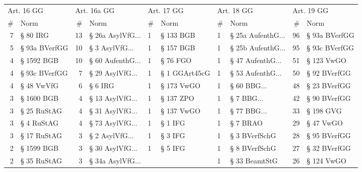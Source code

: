 \vspace{3mm}
\begin{tabular}{rlrlllllrl}
\toprule
\multicolumn{2}{l}{Art. 16 GG} & \multicolumn{2}{l}{Art. 16a GG} & \multicolumn{2}{l}{Art. 17 GG} & \multicolumn{2}{l}{Art. 18 GG} & \multicolumn{2}{l}{Art. 19 GG} \\
         \# &              Norm &           \# &                Norm &          \# &          Norm &          \# &                Norm &          \# &           Norm \\
\midrule
         7 &          § 80 IRG &          13 &  § 26a AsylVfG... &          1 &     § 133 BGB &          1 & § 25a AufenthG... &         96 &  § 93a BVerfGG \\
         5 &     § 93a BVerfGG &          10 &    § 3 AsylVfG... &          1 &     § 157 BGB &          1 & § 25b AufenthG... &         95 &  § 93c BVerfGG \\
         4 &        § 1592 BGB &          10 &  § 60 AufenthG... &          1 &      § 76 FGO &          1 &  § 47 AufenthG... &         51 &     § 123 VwGO \\
         4 &     § 93c BVerfGG &           7 &   § 29 AsylVfG... &          1 & § 1 GGArt45cG &          1 &  § 53 AufenthG... &         50 &   § 92 BVerfGG \\
         4 &        § 48 VwVfG &           6 &             § 6 IRG &          1 &    § 173 VwGO &          1 &       § 60 BBG... &         48 &   § 23 BVerfGG \\
         3 &        § 1600 BGB &           4 &   § 13 AsylVfG... &          1 &     § 137 ZPO &          1 &        § 7 BBG... &         42 &   § 90 BVerfGG \\
         3 &       § 25 RuStAG &           4 &   § 31 AsylVfG... &          1 &    § 137 VwGO &          1 &       § 77 BBG... &         33 &      § 198 GVG \\
         3 &        § 4 RuStAG &           4 &   § 73 AsylVfG... &          1 &       § 1 IFG &          1 &            § 7 BRAO &         29 &      § 47 VwGO \\
         3 &       § 17 RuStAG &           3 &    § 2 AsylVfG... &          1 &       § 3 IFG &          1 &       § 3 BVerfSchG &         28 &   § 95 BVerfGG \\
         2 &        § 1599 BGB &           3 &   § 30 AsylVfG... &          1 &       § 5 IFG &          1 &       § 8 BVerfSchG &         27 &   § 32 BVerfGG \\
         2 &       § 35 RuStAG &           3 &  § 34a AsylVfG... &            &               &          1 &       § 33 BeamtStG &         26 &     § 124 VwGO \\

\end{tabular}
